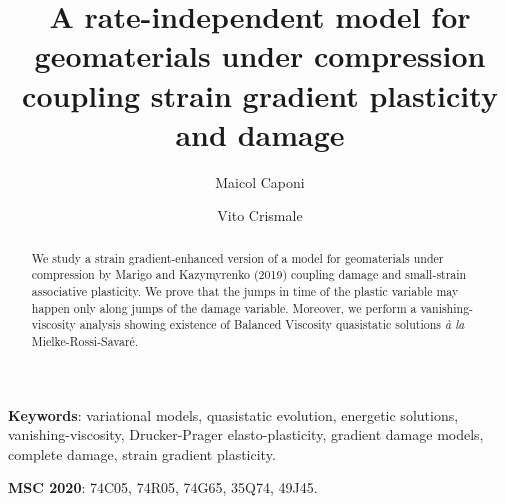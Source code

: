 \documentclass[reqno]{amsart}
\theoremstyle{definition}
\numberwithin{equation}{section}
\begin{document}
\title[A rate-independent model for geomaterials under compression]{A rate-independent model for geomaterials under compression coupling strain gradient plasticity and damage
} 

\author[M. Caponi]{Maicol Caponi}
\address[Maicol Caponi]{Dipartimento di Matematica e Applicazioni ``R. Caccioppoli''
\newline\indent Università degli Studi di Napoli ``Federico II'' 
\newline\indent Via Cintia, Monte S. Angelo, 80126 Naples, Italy}

\author[V. Crismale]{Vito Crismale}
\address[Vito Crismale]{Dipartimento di Matematica ``Guido Castelnuovo''
\newline\indent Sapienza Università di Roma 
\newline\indent Piazzale Aldo Moro 2, I-00185 Roma, Italy}


\begin{abstract}
We study a strain gradient-enhanced version of a model for geomaterials under compression by Marigo and Kazymyrenko (2019) coupling damage and small-strain associative plasticity. We prove that the jumps in time of the plastic variable may happen only along jumps of the damage variable. Moreover, we perform a vanishing-viscosity analysis showing existence of Balanced Viscosity quasistatic solutions \emph{à la} Mielke-Rossi-Savaré.
\end{abstract}

\maketitle

\noindent
{\bf Keywords}: variational models, quasistatic evolution, energetic solutions, vanishing-viscosity,
Drucker-Prager elasto-plasticity, gradient damage models, complete damage, strain gradient plasticity.

\medskip

\noindent
{\bf MSC 2020}: 
74C05, %
74R05, %
74G65, %
35Q74, %
49J45. %
\end{document}
